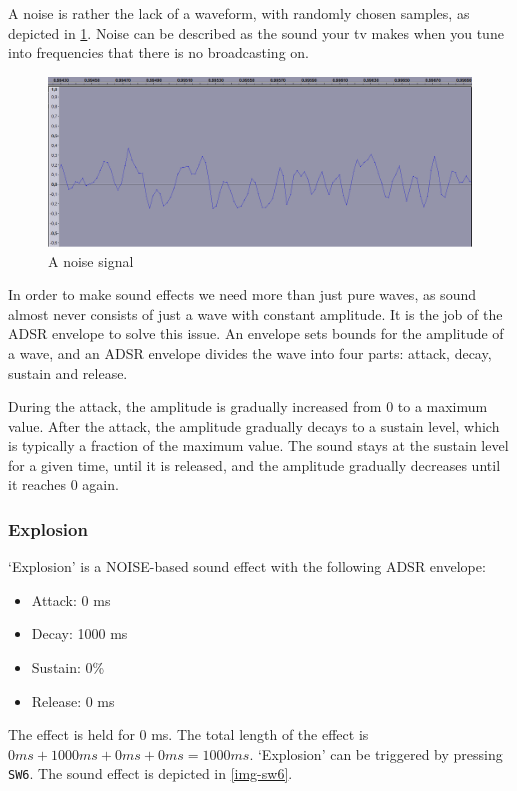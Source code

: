 A noise is rather the lack of a waveform, with randomly chosen samples, as depicted in \ref{img-sw6zoom}.
Noise can be described as the sound your tv makes when you tune into frequencies that there is no broadcasting on.
\begin{figure}[H]
	\includegraphics[width = \textwidth]{images/SW6zoom.png}
	\caption{A noise signal}
	\label{img-sw6zoom}
\end{figure}

In order to make sound effects we need more than just pure waves, as sound almost never consists of just a wave with constant amplitude.
It is the job of the ADSR envelope to solve this issue.
An envelope sets bounds for the amplitude of a wave, and an ADSR envelope divides the wave into four parts: attack, decay, sustain and release.

During the attack, the amplitude is gradually increased from 0 to a maximum value.
After the attack, the amplitude gradually decays to a sustain level, which is typically a fraction of the maximum value.
The sound stays at the sustain level for a given time, until it is released, and the amplitude gradually decreases until it reaches 0 again.

\subsubsection{Explosion}

`Explosion' is a NOISE-based sound effect with the following ADSR envelope:
\begin{itemize}
	\item{Attack: 0 ms}
	\item{Decay: 1000 ms}
	\item{Sustain: 0\%}
	\item{Release: 0 ms}
\end{itemize}
The effect is held for 0 ms.
The total length of the effect is $0 ms + 1000 ms + 0 ms + 0 ms = 1000 ms$.
`Explosion' can be triggered by pressing \texttt{SW6}.
The sound effect is depicted in \ref{img-sw6}.

